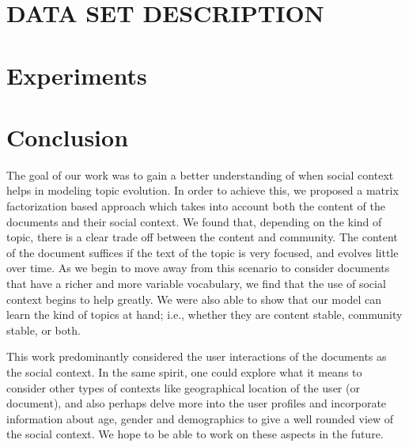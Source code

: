 \section{DATA SET DESCRIPTION}
\label{sec:data_set_description}


\section{Experiments}
\label{sec:experiments}


\section{Conclusion}
\label{sec:conclusion}
The goal of our work was to gain a better understanding of when social context
helps in modeling topic evolution.  In order to achieve this, we proposed a matrix factorization based
approach which takes into account both the content of the documents and their social
context.  We found that, depending on the kind of topic, there is a clear trade
off between the content and community.
The content of the document
suffices if the text of the topic is very focused, and evolves little over time.
As we begin to move away from this scenario to consider documents that have a richer
and more variable vocabulary, we find that the use of social context
begins to help greatly.  We were also able to show
that our model can learn the kind of topics at hand; i.e., whether they are
content stable, community stable, or
both.

This work predominantly considered the user interactions of the documents
as the social context.  In the same spirit, one could explore what it means to consider
other types of contexts like geographical location of the user (or document),
and also perhaps delve more into the user profiles and incorporate information
about age, gender and demographics to give a well rounded view of the social context.
We hope to be able to work on these aspects in the future.
